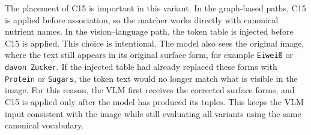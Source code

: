 The placement of C15 is important in this variant. In the graph-based paths, C15 is applied before association, so the matcher works directly with canonical nutrient names. In the vision--language path, the token table is injected before C15 is applied. This choice is intentional. The model also sees the original image, where the text still appears in its original surface form, for example \texttt{Eiwei{\ss}} or \texttt{davon Zucker}. If the injected table had already replaced these forms with \texttt{Protein} or \texttt{Sugars}, the token text would no longer match what is visible in the image. For this reason, the VLM first receives the corrected surface forms, and C15 is applied only after the model has produced its tuples. This keeps the VLM input consistent with the image while still evaluating all variants using the same canonical vocabulary.